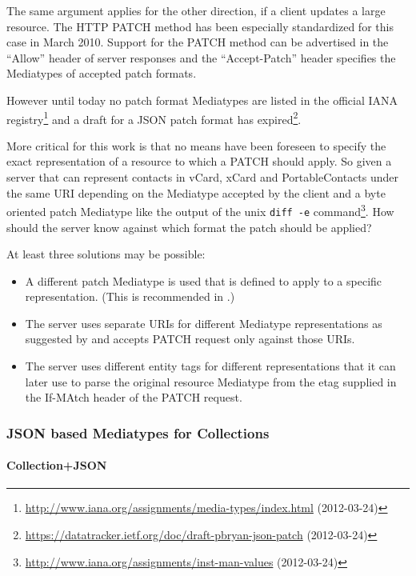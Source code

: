 \documentclass[12pt,a4paper,twoside]{scrartcl}		%
\newcommand{\citeurl}[2]{\url{#1} (#2)}
\begin{document}
The same argument applies for the other direction, if a client updates a large
resource. The HTTP PATCH method\cite{RFC5789} has been especially standardized
for this case in March 2010. Support for the PATCH method can be advertised in
the ``Allow'' header of server responses and the ``Accept-Patch'' header
specifies the Mediatypes of accepted patch formats.

However until today no patch format Mediatypes are listed in the official IANA
registry\footnote{\citeurl{http://www.iana.org/assignments/media-types/index.html}{2012-03-24}}
and a draft for a JSON patch format has
expired\footnote{\citeurl{https://datatracker.ietf.org/doc/draft-pbryan-json-patch}{2012-03-24}}.

More critical for this work is that no means have been foreseen to specify the
exact representation of a resource to which a PATCH should apply. So given a
server that can represent contacts in vCard, xCard and PortableContacts under
the same URI depending on the Mediatype accepted by the client and a byte
oriented patch Mediatype like the output of the unix \lstinline:diff -e:
command\footnote{\citeurl{http://www.iana.org/assignments/inst-man-values}{2012-03-24}}. How
should the server know against which format the patch should be applied?

At least three solutions may be possible:
\begin{itemize}
\item A different patch Mediatype is used that is defined to apply to a specific
  representation. (This is recommended in \cite[ch. 11.9]{Allamaraju_2010}.)
\item The server uses separate URIs for different Mediatype representations as
  suggested by \cite{Raman2006} and accepts PATCH request only against those
  URIs.
\item The server uses different entity tags for different representations that it can later use to parse the original resource Mediatype from the etag supplied in the If-MAtch header of the PATCH request.
\end{itemize}

\subsubsection{JSON based Mediatypes for Collections}
\label{sec:media-types-coll}


\paragraph{Collection+JSON}
\label{sec:collection+json}
\end{document}
